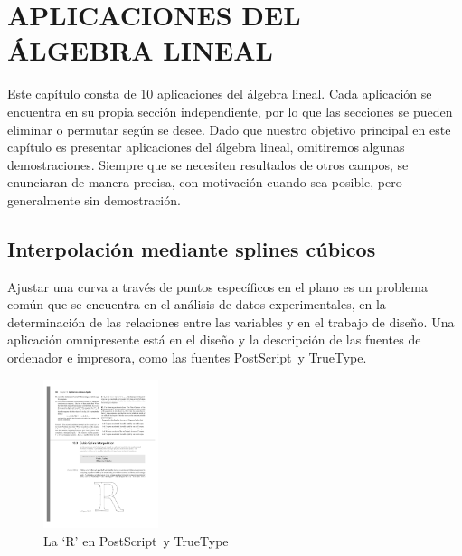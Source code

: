 \chapter[APLICACIONES DEL ÁLGEBRA LINEAL]{APLICACIONES DEL \\ ÁLGEBRA LINEAL}
\printchaptertableofcontents

Este capítulo consta de 10 aplicaciones del álgebra lineal. Cada aplicación se encuentra en su propia sección independiente, por lo que las secciones se pueden eliminar o permutar según se desee. Dado que nuestro objetivo principal en este capítulo es presentar aplicaciones del álgebra lineal, omitiremos algunas demostraciones. Siempre que se necesiten resultados de otros campos, se enunciaran de manera precisa, con motivación cuando sea posible, pero generalmente sin demostración.

\section{Interpolación mediante splines cúbicos}

Ajustar una curva a través de puntos específicos en el plano es un problema común que se encuentra en el análisis de datos experimentales, en la determinación de las relaciones entre las variables y en el trabajo de diseño. Una aplicación omnipresente está en el diseño y la descripción de las fuentes de ordenador e impresora, como las fuentes PostScript\texttrademark ~y TrueType\texttrademark.
\begin{figure}[h!]
    \centering
    \includegraphics[width=0.3\textwidth]{Images/Capitulo8/R.pdf}
    \caption{La ‘R’ en PostScript\texttrademark ~y TrueType\texttrademark}
\end{figure}

\newpage

